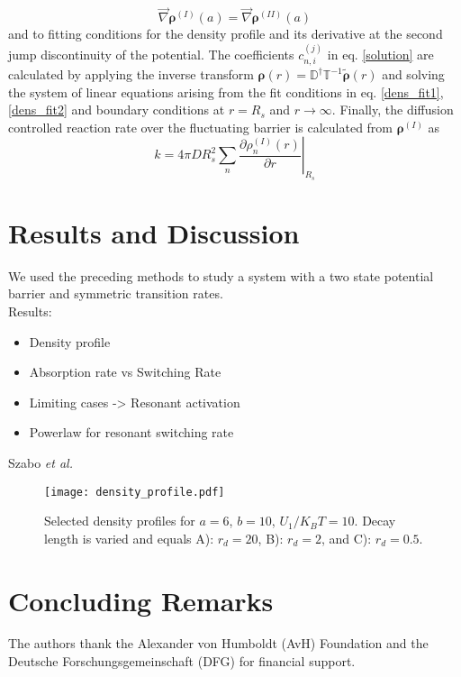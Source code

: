 \documentclass[twocolumn,superscriptaddress]{revtex4}
\newcommand{\vect}[1]{\boldsymbol{\mathbf{#1}}}
\begin{document}
\begin{equation}
    \vec{\nabla}\vect{\rho}^{(I)}(a) =\vec{\nabla}\vect{\rho}^{(II)}(a) 
    \label{dens_fit2}
\end{equation}
and to fitting conditions for the density profile and its derivative at the second jump discontinuity of the potential.
The coefficients $c_{n,i}^{(j)}$ in eq. \eqref{solution} are calculated by applying the inverse transform $\vect{\rho}(r) = \mathbb{D}^{\dagger}\mathbb{T}^{-1}\tilde{\vect{\rho}}(r)$ and solving the system of linear equations arising from the fit conditions in eq. \eqref{dens_fit1}, \eqref{dens_fit2} and boundary conditions at $r=R_s$ and $r \rightarrow \infty$. Finally, the diffusion controlled reaction rate over the fluctuating barrier is calculated from $\vect{\rho}^{(I)}$ as
\begin{equation}
    k = 4 \pi D R_s^{2}\sum_n \left. \frac{\partial \rho_n^{(I)}(r)}{\partial r} \right|_{R_s}
    \label{rate_konstant}
\end{equation}
\section{Results and Discussion}
We used the preceding methods to study a system with a two state potential barrier and symmetric transition rates.\\
Results:
\begin{itemize}
    \item Density profile
    \item Absorption rate vs Switching Rate
    \item Limiting cases -> Resonant activation
    \item Powerlaw for resonant switching rate
\end{itemize}
Szabo {\it et al.}~\cite{Szabo1982}
\begin{minipage}{0.5 \textwidth}
\begin{figure}
\texttt{[image: density\_profile.pdf]}
\caption{Selected density profiles for $a=6$, $b=10$, $U_1/K_B T = 10$. Decay length is varied and equals A): $r_d = 20$, B): $r_d=2$, and C): $r_d=0.5$.}
\label{fig1}
\end{figure}
\end{minipage}


\section{Concluding Remarks}

\acknowledgments
The authors thank the Alexander von Humboldt (AvH) Foundation and the Deutsche Forschungsgemeinschaft (DFG) 
for financial support. 


\end{document}
